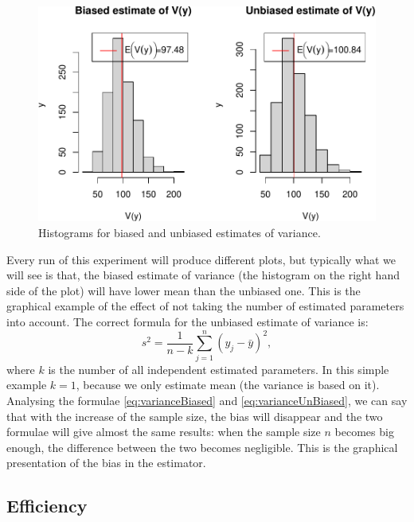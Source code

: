 \documentclass[
]{book}
\theoremstyle{definition}
\theoremstyle{definition}
\theoremstyle{definition}
\theoremstyle{definition}
\theoremstyle{remark}
\begin{document}
\begin{figure}
\centering
\includegraphics{Svetunkov---Statistics-for-Business-Analytics_files/figure-latex/unnamed-chunk-25-1.pdf}
\caption{\label{fig:unnamed-chunk-25}Histograms for biased and unbiased estimates of variance.}
\end{figure}

Every run of this experiment will produce different plots, but typically what we will see is that, the biased estimate of variance (the histogram on the right hand side of the plot) will have lower mean than the unbiased one. This is the graphical example of the effect of not taking the number of estimated parameters into account. The correct formula for the unbiased estimate of variance is:
\begin{equation}
    s^2 = \frac{1}{n-k} \sum_{j=1}^n \left( y_j - \bar{y} \right)^2,
    \label{eq:varianceUnBiased}
\end{equation}
where \(k\) is the number of all independent estimated parameters. In this simple example \(k=1\), because we only estimate mean (the variance is based on it). Analysing the formulae \eqref{eq:varianceBiased} and \eqref{eq:varianceUnBiased}, we can say that with the increase of the sample size, the bias will disappear and the two formulae will give almost the same results: when the sample size \(n\) becomes big enough, the difference between the two becomes negligible. This is the graphical presentation of the bias in the estimator.

\subsection{Efficiency}\label{estimatesPropertiesEfficiency}
\end{document}
